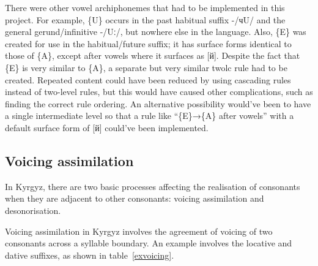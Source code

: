 \documentclass[10pt,a4paper,twocolumn]{article}
\begin{document}
\begin{table}[htbp]
	\centering
	\caption{vowel harmony for archiphoneme \{A\}}\label{vowelharmonyA}
	\hspace{2em}
\end{table}

There were other vowel archiphonemes that had to be implemented in this project.  For example, \{U\} occurs in the past habitual suffix -/чU/ and the general gerund/infinitive -/Uː/, but nowhere else in the language.  Also, \{E\} was created for use in the habitual/future suffix; it has surface forms identical to those of \{A\}, except after vowels where it surfaces as [й].  Despite the fact that \{E\} is very similar to \{A\}, a separate but very similar twolc rule had to be created.  Repeated content could have been reduced by using cascading rules instead of two-level rules, but this would have caused other complications, such as finding the correct rule ordering.  An alternative possibility would’ve been to have a single intermediate level so that a rule like ``\{E\}→\{A\} after vowels'' with a default surface form of [й] could've been implemented.


\subsection{Voicing assimilation}\label{devoicing}
In Kyrgyz, there are two basic processes affecting the realisation of consonants when they are adjacent to other consonants: voicing assimilation and desonorisation.

Voicing assimilation in Kyrgyz involves the agreement of voicing of two consonants across a syllable boundary.  An example involves the locative and dative suffixes, as shown in table~\ref{exvoicing}.
\end{document}
